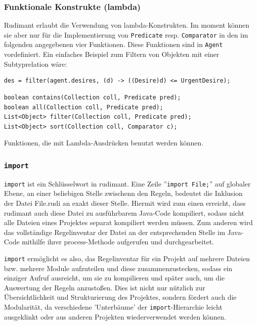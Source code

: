 \subsubsection{Funktionale Konstrukte (lambda)}

Rudimant erlaubt die Verwendung von lambda-Konstrukten. Im moment können sie
aber nur für die Implementierung von \texttt{Predicate}
resp. \texttt{Comparator} in den im folgenden angegebenen vier
Funktionen. Diese Funktionen sind in \texttt{Agent} vordefiniert. Ein
einfaches Beispiel zum Filtern von Objekten mit einer Subtyprelation wäre:

\begin{verbatim}
des = filter(agent.desires, (d) -> ((Desire)d) <= UrgentDesire);
\end{verbatim}


\begin{table}[htbp]
  \centering
  \begin{small}
\begin{verbatim}
boolean contains(Collection coll, Predicate pred);
boolean all(Collection coll, Predicate pred);
List<Object> filter(Collection coll, Predicate pred);
List<Object> sort(Collection coll, Comparator c);
\end{verbatim}
  \end{small}

  \caption{Funktionen, die mit Lambda-Ausdrücken benutzt werden können.}
  \label{tab:lambda-functions}
\end{table}

\subsubsection{\texttt{import}}

\texttt{import} ist ein Schlüsselwort in rudimant. Eine Zeile ''\texttt{import
  File;}'' auf globaler Ebene, an einer beliebigen Stelle zwischenn den Regeln,
bedeutet die Inklusion der Datei File.rudi an exakt dieser Stelle. Hiermit wird
zum einen erreicht, dass rudimant auch diese Datei zu ausführbarem Java-Code
kompiliert, sodass nicht alle Dateien eines Projektes separat kompiliert werden
müssen. Zum anderen wird das vollständige Regelinventar der Datei an der
entsprechenden Stelle im Java-Code mithilfe ihrer process-Methode aufgerufen
und durchgearbeitet.

\texttt{import} ermöglicht es also, das Regelinventar für ein Projekt auf
mehrere Dateien bzw. mehrere Module aufzuteilen und diese zusammenzustecken,
sodass ein einziger Aufruf ausreicht, um sie zu kompilieren und später auch, um
die Auswertung der Regeln anzustoßen. Dies ist nicht nur nützlich zur
Übersichtlichkeit und Strukturierung des Projektes, sondern fördert auch die
Modularität, da verschiedene 'Unterbäume' der \texttt{import}-Hierarchie leicht
ausgeklinkt oder aus anderen Projekten wiederverwendet werden können.

